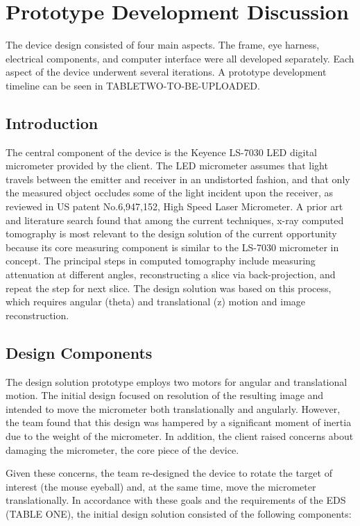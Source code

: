 \documentclass{article}
\begin{document}
\section{Prototype Development Discussion}
\label{sec:prot-devel-disc}
 
The device design consisted of four main aspects. The frame, eye harness, electrical components, and computer interface were all developed separately. Each aspect of the device underwent several iterations. A prototype development timeline can be seen in TABLETWO-TO-BE-UPLOADED.

\subsection{Introduction}
\label{sec:prior-art}
	The central component of the device is the Keyence LS-7030 LED digital micrometer provided by 
the client. The LED micrometer assumes that light travels between the emitter and receiver in an 
undistorted fashion, and that only the measured object occludes some of the light incident upon the 
receiver, as reviewed in US patent No.6,947,152, High Speed Laser Micrometer.  A prior art and literature search found that among the current techniques, x-ray computed tomography is most relevant to the design solution of the current opportunity because its core measuring component is similar to the LS-7030 micrometer in concept. The principal steps in computed tomography 
include measuring attenuation at different angles, reconstructing a slice via back-projection, and repeat the step for next slice. The design solution was based on this process, which requires angular (theta) and 
translational (z) motion and image reconstruction. 

\subsection{Design Components}
\label{sec:prototype-comp}
	The design solution prototype employs two motors for angular and translational motion. The initial design focused on resolution of the resulting image and intended to move the micrometer both translationally and angularly. However, the team found that this design was hampered by a significant moment of inertia due to the weight of the micrometer. In addition, the client raised concerns about damaging the micrometer, the core piece of the device. 

Given these concerns, the team re-designed the device to rotate the target of interest (the mouse eyeball) and, at the same time, move the micrometer translationally. In accordance with these goals and the requirements of the EDS (TABLE ONE), the initial design solution consisted of the following components: 
\end{document}
